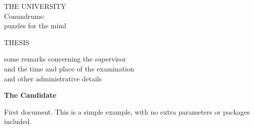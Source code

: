 \documentclass[a4paper, 12pt]{article}
\author{
    Narongrit Unwerawattana\\
    Department of Mathematics and Computer Science\\
    \texttt{naunw18@student.sdu.dk}\vspace{40pt} \\

}
\begin{document}
\begingroup%
\textheight
\vspace*{\drop}
\centering
{\LARGE THE UNIVERSITY}\\[2\baselineskip]
{\LARGE\sffamily Conundrums: \\ puzzles for the mind}\par
\vfill
{\LARGE THESIS}\par
\vspace{\drop}
{\large some remarks concerning the supervisor \\
and the time and place of the examination \\
and other administrative details}\par
\vfill
{\large\bfseries The Candidate}\par
\vspace*{\drop}
\endgroup

First document. This is a simple example, with no 
extra parameters or packages included.
\end{document}
